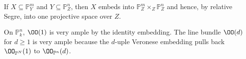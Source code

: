 \begin{example}\label{ex:vi38-15}
If \(X\subseteq\mathbb P^m_Y\) and \(Y\subseteq\mathbb P^n_Z\), then \(X\) embeds into \(\mathbb P^m_Z\times_Z\mathbb P^n_Z\) and hence, by relative Segre, into one projective space over \(Z\).
\end{example}

\begin{example}\label{ex:vi38-16}
On \(\mathbb P^n_k\), \(\OO(1)\) is very ample by the identity embedding.  The line bundle \(\OO(d)\) for \(d\ge1\) is very ample because the \(d\)-uple Veronese embedding pulls back \(\OO_{\mathbb P^N}(1)\) to \(\OO_{\mathbb P^n}(d)\).
\end{example}

